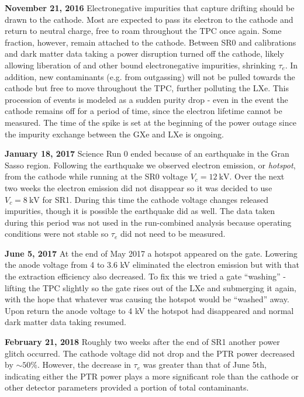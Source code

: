 \textbf{November 21, 2016}  Electronegative impurities that capture drifting \electron should be drawn to the cathode.  Most are
expected to pass its electron to the cathode and return to neutral charge, free to roam throughout the TPC once again.  Some fraction,
however, remain attached to the cathode.  Between SR0 \ambe and \metakr calibrations and dark matter data taking a power disruption
turned off the cathode, likely allowing liberation of  and other bound electronegative impurities, shrinking
$\tau_e$.  In addition, new contaminants (e.g. from outgassing) will not be pulled towards the cathode but free to move throughout the TPC,
further polluting the LXe.  This procession of events is modeled as a sudden purity drop - even in the event the cathode remains off for a
period of time, since the electron lifetime cannot be measured.  The time of the spike is set at the beginning of the power outage since
the impurity exchange between the GXe and LXe is ongoing.

\textbf{January 18, 2017} Science Run 0 ended because of an earthquake in the Gran Sasso region.  Following the earthquake we observed
electron emission, or \textit{hotspot}, from the cathode while running at the SR0 voltage $V_c = 12\ \mathrm{kV}$.  Over the next two
weeks the electron emission did
not disappear so it was decided to use $V_c = 8\ \mathrm{kV}$ for SR1.  During this time the cathode voltage changes released impurities,
though it is possible the earthquake did as well.  The data taken during this period was not used in the run-combined analysis because
operating conditions were not stable so $\tau_e$ did not need to be measured.

\textbf{June 5, 2017}  At the end of May 2017 a hotspot appeared on the gate.  Lowering the anode voltage from 4 to 3.6 kV eliminated the
electron emission but with that the extraction efficiency also decreased.  To fix this we tried a gate ``washing'' - lifting the TPC
slightly so the gate rises out of the LXe and submerging it again, with the hope that whatever was causing the hotspot would be ``washed''
away.  Upon return the anode voltage to 4 kV the hotspot had disappeared and normal dark matter data taking resumed.

\textbf{February 21, 2018}  Roughly two weeks after the end of SR1 another power glitch occurred.  The cathode voltage did not drop and
the PTR power decreased by ${\sim} 50\%$.  However, the decrease in $\tau_e$ was greater than that of June 5th, indicating either the PTR
power plays a more significant role than the cathode or other detector parameters provided a portion of total contaminants.

